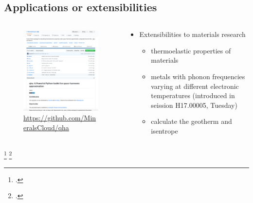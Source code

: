 \documentclass[13pt,aspectratio=169]{beamer}
\begin{document}
\subsection{Applications or extensibilities}
\begin{frame}{\subsecname}
	\begin{columns}
		\begin{column}{0.45\textwidth}
			\begin{figure}
				\includegraphics[height=0.7\textheight]{images/website}%
				\captionsetup{labelformat=empty}
				\caption{\scriptsize\url{https://github.com/MineralsCloud/qha}}
			\end{figure}
		\end{column}

		\begin{column}{0.45\textwidth}
			\begin{itemize}[<+(1)->]
				\item Extensibilities to materials research
				      \begin{itemize}
					      \item thermoelastic properties of materials\footnotemark
					      \item metals with phonon frequencies varying at different electronic temperatures (introduced in seission H17.00005, Tuesday)
					      \item calculate the geotherm and isentrope\footnotemark
				      \end{itemize}
			\end{itemize}
		\end{column}
	\end{columns}
	\setcounter{footnote}{7}
	\footcitetext{Wu:2011ea}
	\footcitetext{Cardona:2017dd}
\end{frame}
\end{document}
